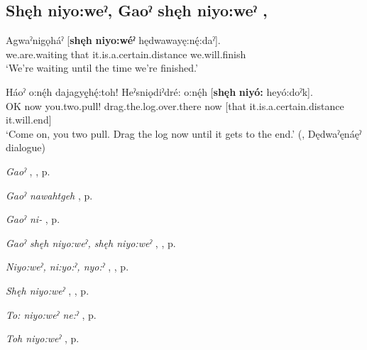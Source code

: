 \subsection*{\textbf{Shęh niyo:weˀ, Gaoˀ shęh niyo:weˀ} , } \label{p:[shęh niyo:weˀ, gaoˀ shęh niyo:weˀ]}

\ea
\label{ex:spart43}
\gll Agwaˀnigǫháˀ [\textbf{shęh} \textbf{niyo:wéˀ} hędwawayę:nę́:daˀ].\\
we.are.waiting that it.is.a.certain.distance we.will.finish\\
\glt ‘We’re waiting until the time we’re finished.’
\z

\ea
\label{ex:spart44}
\gll Háoˀ o:nę́h dajagyę̱hę́:toh! Heˀsniǫdiˀdré: o:nę́h [\textbf{shęh} \textbf{niyó:} heyó:doˀk].\\
OK now you.two.pull! drag.the.log.over.there now [that it.is.a.certain.distance it.will.end]\\
\glt ‘Come on, you two pull. Drag the log now until it gets to the end.’ (\cite[481]{mithun_watewayestanih_1984}, Dędwaˀęnáęˀ dialogue)
\z

\begin{CayugaRelated}
\item \textit{Gaoˀ} , , p. \pageref{p:[gaoˀ]}\\
\item \textit{Gaoˀ nawahtgeh} , p. \pageref{p:[gaoˀ nawahtgeh]}\\
\item \textit{Gaoˀ ni-} , p. \pageref{p:[gaoˀ ni-]}\\
\item \textit{Gaoˀ shęh niyo:weˀ, shęh niyo:weˀ} , , p. \pageref{p:[gaoˀ shęh niyo:weˀ]}\\
\item \textit{Niyo:weˀ, ni:yo:ˀ, nyo:ˀ} , , p. \pageref{p:[niyo:weˀ]}\\
\item \textit{Shęh niyo:weˀ} , , p. \pageref{p:[shęh niyo:weˀ]}\\
\item \textit{To: niyo:weˀ ne:ˀ} , p. \pageref{p:[to: niyo:weˀ ne:ˀ]}\\
\item \textit{Toh niyo:weˀ} , p. \pageref{p:[toh niyo:weˀ]}
\end{CayugaRelated}

